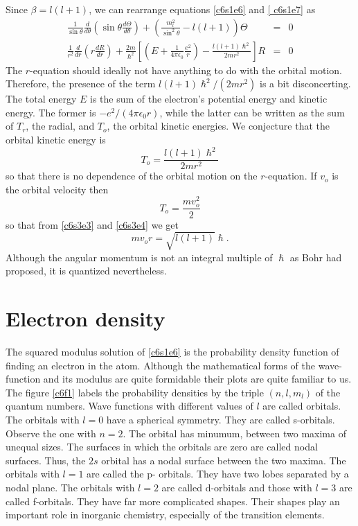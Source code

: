 Since $\beta = l(l+1)$, we can rearrange equations \eqref{c6s1e6} and \eqref{
c6s1e7} as 
\begin{eqnarray}
\frac{1}{\sin\theta}\frac{d}{d\theta}
\left(\sin\theta\frac{d\Theta}{d\theta}\right) + 
\left(\frac{m_l^2}{\sin^2\theta} - l(l+1)\right)\Theta &=& 0 \label{c6s3e1} \\
\frac{1}{r^2}\frac{d}{dr}\left(r\frac{dR}{dr}\right) + \frac{2m}{\hslash^2}
\left[\left(E + \frac{1}{4\pi\epsilon_0}\frac{e^2}{r}\right)
- \frac{l(l+1)\hslash^2}{2mr^2}\right]R &=& 0 \label{c6s3e2}
\end{eqnarray}
The $r$-equation should ideally not have anything to do with the orbital motion.
Therefore, the presence of the term $l(l+1)\hslash^2/(2mr^2)$ is a bit 
disconcerting. The total energy $E$ is the sum of the electron's potential
energy and kinetic energy. The former is $-e^2/(4\pi\epsilon_0 r)$, while the 
latter can be written as the sum of $T_r$, the radial, and $T_o$, the orbital
kinetic energies. We conjecture that the orbital kinetic energy is
\begin{equation}\label{c6s3e3}
T_o = \frac{l(l+1)\hslash^2}{2mr^2}
\end{equation}
so that there is no dependence of the orbital motion on the $r$-equation. If
$v_o$ is the orbital velocity then 
\begin{equation}\label{c6s3e4}
T_o = \frac{mv_o^2}{2}
\end{equation}
so that from \eqref{c6s3e3} and \eqref{c6s3e4} we get
\begin{equation}\label{c6s3e5}
mv_or = \sqrt{l(l+1)}\hslash.
\end{equation}
Although the angular momentum is not an integral multiple of $\hslash$ as Bohr
had proposed, it is quantized nevertheless.

\section{Electron density}\label{c6s4}
The squared modulus solution of \eqref{c6s1e6} is the probability density 
function of finding an electron in the atom. Although the mathematical forms 
of the wave-function and its modulus are quite formidable their plots are quite
familiar to us. The figure \ref{c6f1} labels the probability densities by the
triple $(n, l, m_l)$ of the quantum numbers. Wave functions with different 
values of $l$ are called orbitals. The orbitals with $l = 0$ have a spherical 
symmetry.  They are called s-orbitals. Observe the one with $n=2$. The orbital 
has minumum, between two maxima of unequal sizes. The surfaces in which the 
orbitals are zero are called nodal surfaces. Thus, the $2s$ orbital has a nodal 
surface between the two maxima. The orbitals with $l = 1$ are called the p-
orbitals. They have two lobes separated by a nodal plane. The orbitals with 
$l = 2$ are called d-orbitals and those with $l = 3$ are called f-orbitals. 
They have far more complicated shapes. Their shapes play an important role in 
inorganic chemistry, especially of the transition elements.

